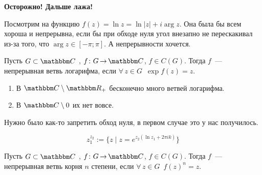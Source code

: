 \documentclass[12pt]{../../notes}
\begin{document}
\textbf{Осторожно! Дальше лажа!}

Посмотрим на функцию $f(z) = \ln z = \ln |z| + i \arg z$. Она была бы всем хороша
и непрерывна, если бы при обходе нуля угол внезапно не перескакивал из-за того, что $\arg z \in[-\pi;\pi]$.
А непрерывности хочется.

\begin{defn}\label{defn:logcontbranch}
  Пусть $G \subset \C$ , $f \colon G \to \C$, $f\in C(G)$. Тогда $f$~--- непрерывная ветвь логарифма, если 
  $\forall\, z\in G \;\: \exp f(z) = z$.
\end{defn}

\begin{thrm}
  \begin{enumerate}
    \item В $\C \setminus \R_+$ бесконечно много ветвей логарифма.
    \item В $\C \setminus {0}$ их нет вовсе.
  \end{enumerate}
\end{thrm}
Нужно было как-то запретить обход нуля, в первом случае это у нас получилось.

\begin{defn}\label{defn:complpower}
  \[
    z_1^{z_2} := \{ z \mid z = e^{z_2(\ln z_1 + 2\pi i k )} \}
  \]
\end{defn}

\begin{defn}\label{defn:rootcontbrnch}
  Пусть $G \subset \C$ , $f \colon G \to \C$, $f\in C(G)$. Тогда $f$~--- непрерывная ветвь корня $n$ степени,
  если $\forall\, z\in G \;\: f(z)^n = z$.
\end{defn}
\end{document}
